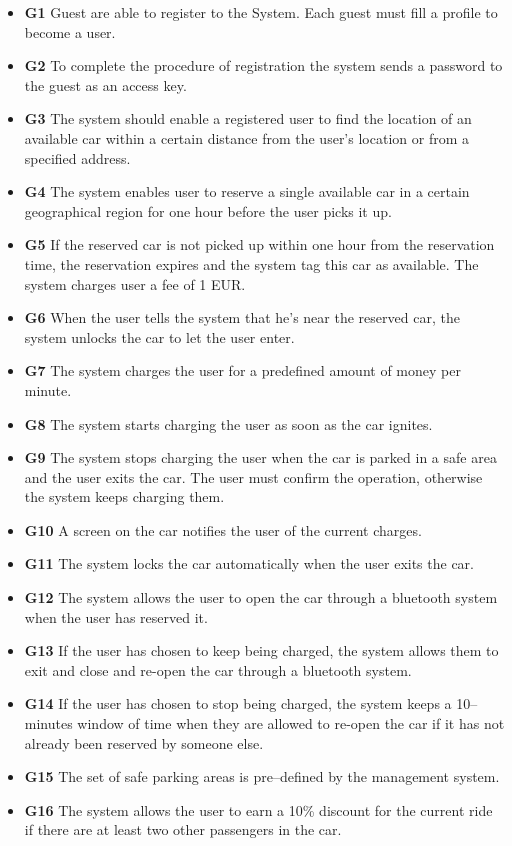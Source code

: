 			\begin{itemize}
				\item \textbf{G1} Guest are able to register to the System. Each guest must fill a profile to become a user. %
				\item \textbf{G2} To complete the procedure of registration the system sends a password to the guest as an access key. %
				\item \textbf{G3} The system should enable a registered user to find the location of an available car within a certain distance from the user's location or from a specified address.
				\item \textbf{G4} The system enables user to reserve a single available car in a certain geographical region for one hour before the user picks it up.
				\item \textbf{G5} If the reserved car is not picked up within one hour from the reservation time, the reservation expires and the system tag this car as available. The system charges user a fee of 1 EUR. 
				\item \textbf{G6} When the user tells the system that he's near the reserved car, the system unlocks the car to let the user enter.  

				\item \textbf{G7} The system charges the user for a predefined amount of money per minute.
				\item \textbf{G8} The system starts charging the user as soon as the car ignites.
				\item \textbf{G9} The system stops charging the user when the car is parked in a safe area and the user exits the car. The user must confirm the operation, otherwise the system keeps charging them. 
				\item \textbf{G10} A screen on the car notifies the user of the current charges.
				\item \textbf{G11} The system locks the car automatically when the user exits the car. 
				\item \textbf{G12} The system allows the user to open the car through a bluetooth system when the user has reserved it.
				\item \textbf{G13} If the user has chosen to keep being charged, the system allows them to exit and close and re-open the car through a bluetooth system.
				\item \textbf{G14} If the user has chosen to stop being charged, the system keeps a 10–minutes window of time when they are allowed to re-open the car if it has not already been reserved by someone else.
				\item \textbf{G15} The set of safe parking areas is pre–defined by the management system.
				\item \textbf{G16} The system allows the user to earn a 10\% discount for the current ride if there are at least two other passengers in the car.


\end{itemize}
